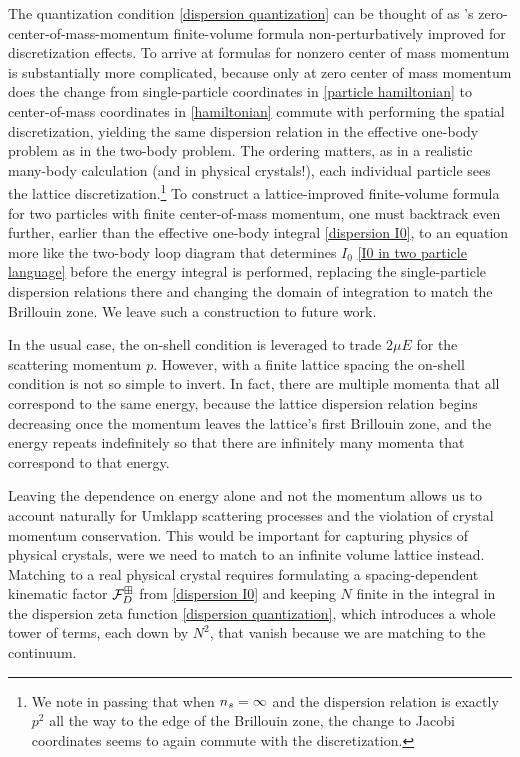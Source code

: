 The quantization condition \eqref{dispersion quantization} can be thought of as \Luscher's zero-center-of-mass-momentum finite-volume formula non-perturbatively improved for discretization effects.
To arrive at formulas for nonzero center of mass momentum is substantially more complicated, because only at zero center of mass momentum does the change from single-particle coordinates in \eqref{particle hamiltonian} to center-of-mass coordinates in \eqref{hamiltonian} commute with performing the spatial discretization, yielding the same dispersion relation in the effective one-body problem as in the two-body problem.
The ordering matters, as in a realistic many-body calculation (and in physical crystals!), each individual particle sees the lattice discretization.\footnote{
We note in passing that when ${n_s}=\infty$ and the dispersion relation is exactly $p^2$ all the way to the edge of the Brillouin zone, the change to Jacobi coordinates seems to again commute with the discretization.}
To construct a lattice-improved finite-volume formula for two particles with finite center-of-mass momentum, one must backtrack even further, earlier than the effective one-body integral \eqref{dispersion I0}, to an equation more like the two-body loop diagram that determines $I_0$ \eqref{I0 in two particle language} before the energy integral is performed, replacing the single-particle dispersion relations there and changing the domain of integration to match the Brillouin zone.
We leave such a construction to future work.

In the usual case, the on-shell condition is leveraged to trade $2\mu E$ for the scattering momentum $p$.
However, with a finite lattice spacing the on-shell condition is not so simple to invert.
In fact, there are multiple momenta that all correspond to the same energy, because the lattice dispersion relation begins decreasing once the momentum leaves the lattice's first Brillouin zone, and the energy repeats indefinitely so that there are infinitely many momenta that correspond to that energy.

Leaving the dependence on energy alone and not the momentum allows us to account naturally for Umklapp scattering processes and the violation of crystal momentum conservation.
This would be important for capturing physics of physical crystals, were we need to match to an infinite volume lattice instead.
Matching to a real physical crystal requires formulating a spacing-dependent kinematic factor $\mathcal{F}_D^\boxplus$ from \eqref{dispersion I0} and keeping $N$ finite in the integral in the dispersion zeta function \eqref{dispersion quantization}, which introduces a whole tower of terms, each down by $N^2$, that vanish because we are matching to the continuum.
